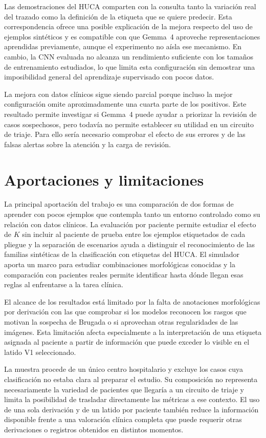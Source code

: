 Las demostraciones del HUCA comparten con la consulta tanto la variación real del trazado como la definición de la etiqueta que se quiere predecir. Esta correspondencia ofrece una posible explicación de la mejora respecto del uso de ejemplos sintéticos y es compatible con que Gemma~4 aproveche representaciones aprendidas previamente, aunque el experimento no aísla ese mecanismo. En cambio, la CNN evaluada no alcanza un rendimiento suficiente con los tamaños de entrenamiento estudiados, lo que limita esta configuración sin demostrar una imposibilidad general del aprendizaje supervisado con pocos datos.

La mejora con datos clínicos sigue siendo parcial porque incluso la mejor configuración omite aproximadamente una cuarta parte de los positivos. Este resultado permite investigar si Gemma~4 puede ayudar a priorizar la revisión de casos sospechosos, pero todavía no permite establecer su utilidad en un circuito de triaje. Para ello sería necesario comprobar el efecto de sus errores y de las falsas alertas sobre la atención y la carga de revisión.

\section{Aportaciones y limitaciones}
\label{sec:limitaciones}

La principal aportación del trabajo es una comparación de dos formas de aprender con pocos ejemplos que contempla tanto un entorno controlado como su relación con datos clínicos. La evaluación por paciente permite estudiar el efecto de \(K\) sin incluir al paciente de prueba entre los ejemplos etiquetados de cada pliegue y la separación de escenarios ayuda a distinguir el reconocimiento de las familias sintéticas de la clasificación con etiquetas del HUCA. El simulador aporta un marco para estudiar combinaciones morfológicas conocidas y la comparación con pacientes reales permite identificar hasta dónde llegan esas reglas al enfrentarse a la tarea clínica.

El alcance de los resultados está limitado por la falta de anotaciones morfológicas por derivación con las que comprobar si los modelos reconocen los rasgos que motivan la sospecha de Brugada o si aprovechan otras regularidades de las imágenes. Esta limitación afecta especialmente a la interpretación de una etiqueta asignada al paciente a partir de información que puede exceder lo visible en el latido V1 seleccionado.

La muestra procede de un único centro hospitalario y excluye los casos cuya clasificación no estaba clara al preparar el estudio. Su composición no representa necesariamente la variedad de pacientes que llegaría a un circuito de triaje y limita la posibilidad de trasladar directamente las métricas a ese contexto. El uso de una sola derivación y de un latido por paciente también reduce la información disponible frente a una valoración clínica completa que puede requerir otras derivaciones o registros obtenidos en distintos momentos.

